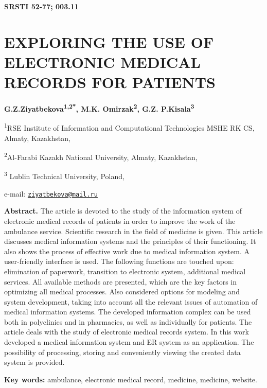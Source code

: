 {\bfseries SRSTI 52-77; 003.11}

\section{EXPLORING THE USE OF ELECTRONIC MEDICAL RECORDS FOR PATIENTS}
\begin{center}
{\bfseries G.Z.Ziyatbekova\textsuperscript{1,2*}, M.K.
Omirzak\textsuperscript{2}, G.Z. P.Kisala\textsuperscript{3}}

\textsuperscript{1}RSE Institute of Information and Computational
Technologies MSHE RK CS, Almaty, Kazakhstan,

\textsuperscript{2}Al-Farabi Kazakh National University, Almaty,
Kazakhstan,

\textsuperscript{3} Lublin Technical University,
Poland,

e-mail:
\href{mailto:ziyatbekova@mail.ru}{\nolinkurl{ziyatbekova@mail.ru}}
\end{center}

{\bfseries Abstract.} The article is devoted to the study of the
information system of electronic medical records of patients in order to
improve the work of the ambulance service. Scientific research in the
field of medicine is given. This article discusses medical information
systems and the principles of their functioning. It also shows the
process of effective work due to medical information system. A
user-friendly interface is used. The following functions are touched
upon: elimination of paperwork, transition to electronic system,
additional medical services. All available methods are presented, which
are the key factors in optimizing all medical processes. Also considered
options for modeling and system development, taking into account all the
relevant issues of automation of medical information systems. The
developed information complex can be used both in polyclinics and in
pharmacies, as well as individually for patients. The article deals with
the study of electronic medical records system. In this work developed a
medical information system and ER system as an application. The
possibility of processing, storing and conveniently viewing the created
data system is provided.

{\bfseries Key words:} ambulance, electronic medical record, medicine,
medicine, website.

